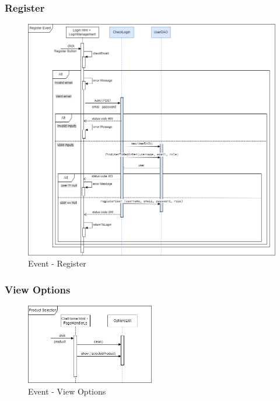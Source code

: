 \documentclass[a4paper, 12pt]{article}
\begin{document}
\subsubsection{Register}
\begin{figure}[h!]
	\centering
	\includegraphics[width=1\textwidth]{RIA_images/RegisterEvent.png}
	\caption{Event - Register}
	\label{figure:RegisterRIA}
\end{figure}
\subsubsection{View Options}
\begin{figure}[h!]
	\centering
	\includegraphics[width=0.5\textwidth]{RIA_images/ViewOptionsEvent.png}
	\caption{Event - View Options}
	\label{figure:ViewOptionsRIA}
\end{figure}
\end{document}
